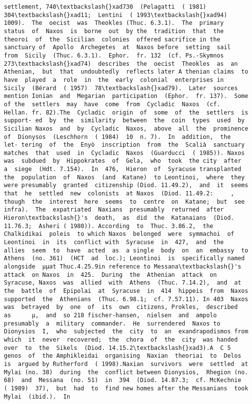 \documentclass[11pt]{article}
\begin{document}
\begin{Verbatim}[commandchars=\\\{\}]
settlement, 740\textbackslash{}xad730  (Pelagatti  ( 1981) 304\textbackslash{}xad11;  Lentini  ( 1993\textbackslash{}xad94)  1009).  The  oecist  was  Theokles (Thuc. 6.3.1).  The  primary  status  of  Naxos  is  borne  out  by the  tradition  that  the  theoroi  of  the  Sicilian  colonies  offered sacrifice in the sanctuary of  Apollo  Archegetes  at  Naxos before  setting  sail  from  Sicily  (Thuc. 6.3.1).  Ephor.  fr. 132  (cf. Ps.-Skymnos  273\textbackslash{}xad74)  describes  the  oecist  Theokles  as  an Athenian,  but  that  undoubtedly  reflects later A thenian claims  to  have  played  a  role  in  the  early  colonial  enterprises in  Sicily  (Bérard  ( 1957)  78\textbackslash{}xad79).  Later  sources  mention Ionian  and  Megarian  participation  (Ephor.  fr. 137).  Some  of the  settlers  may  have  come  from  Cycladic  Naxos  (cf.  Hellan. fr. 82).The  Cycladic  origin  of  some  of  the  settlers  is  support- ed  by  the  similarity  between  the  coin  types  used  by  Sicilian Naxos  and  by  Cycladic  Naxos,  above  all  the  prominence  of  Dionysos  (Leschhorn  ( 1984)  10  n. 7).  In  addition,  the  let- tering  of  the  Enyò  inscription  from  the  Scalià  sanctuary matches  that  used  in  Cycladic  Naxos  (Guarducci  ( 1985)). Naxos  was  subdued  by  Hippokrates  of  Gela,  who  took  the city  after  a  siege  (Hdt. 7.154).  In  476,  Hieron  of  Syracuse transplanted  the  population  of  Naxos  (and  Katane)  to Leontinoi,  where  they  were presumably  granted  citizenship (Diod. 11.49.2),  and  it  seems  that  he  settled  new  colonists  at Naxos  (Diod. 11.49.2:     , though  the  interest  here  seems  to  centre  on  Katane;  but  see infra).  The  expatriated  Naxians  presumably  returned  after Hieron\textbackslash{}'s  death,  as  did  the  Katanaians  (Diod. 11.76.3;  Asheri ( 1980)). According  to  Thuc. 3.86.2,  the  Chalkidikai  poleis  to which Naxos  belonged  were  symmachoi  of  Leontinoi  in  its  conflict with  Syracuse  in  427,  and  the  allies  seem  to  have  acted  as  a single  body  on  an  embassy  to  Athens  (no. 361)  (HCT  ad  loc.); Leontinoi  is  specifically named alongside  µµat Thuc.4.25.9in reference to Messana\textbackslash{}'s attack  on Naxos  in  425.  During  the  Athenian  attack  on  Syracuse, Naxos  was  allied  with  Athens  (Thuc. 7.14.2),  and  at  the  battle  of  Epipolai  at  Syracuse  in  414  hippeis  from  Naxos  supported  the  Athenians  (Thuc. 6.98.1;  cf. 7.57.11). In 403  Naxos  was  betrayed  by  one  of  its  own  citizens, Prokles,  described  as      µ,  and  so 218 fischer-hansen,  nielsen  and  ampolo presumably  a  military  commander.  He  surrendered  Naxos to  Dionysios  I,  who  subjected  the  city  to  an  exandrapodismos from  which  it  never  recovered;  the  chora  of  the  city  was handed  over  to  the  Sikels  (Diod. 14.15.2\textbackslash{}xad3).A  C 5  genos  of  the Amphikleidai  organising  Naxian  theoriai  to  Delos  is  argued by Rutherford  ( 1998).Naxian  survivors  were  settled  at  Mylai (no. 38)  during  the  conflict between Dionysios,  Rhegion (no. 68)  and  Messana  (no. 51)  in  394  (Diod. 14.87.3;  cf. McKechnie  ( 1989)  37),  but  had  to  find new homes after the Messanians  took  Mylai  (ibid.).  In  
\end{Verbatim}
\end{document}
